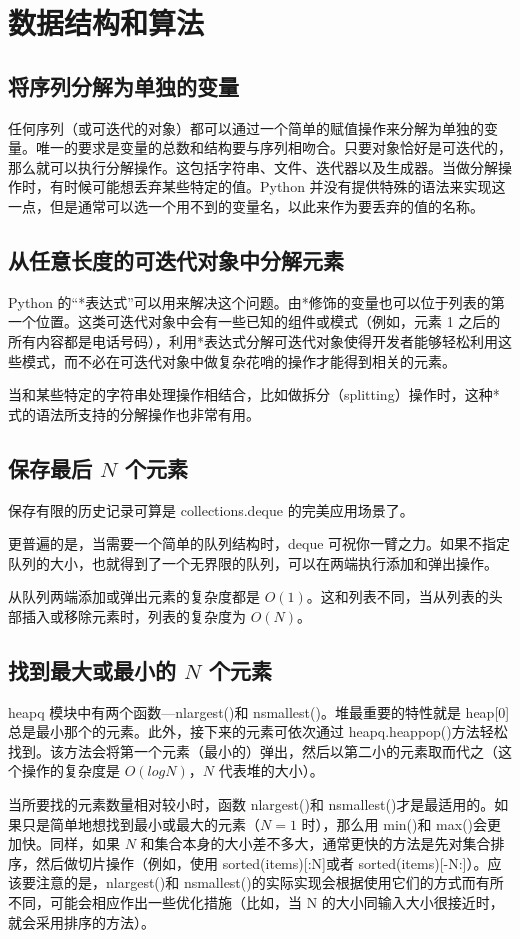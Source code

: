 \chapter{数据结构和算法\label{ch09}}
\section{将序列分解为单独的变量}
任何序列（或可迭代的对象）都可以通过一个简单的赋值操作来分解为单独的变量。唯一的要求是变量的总数和结构要与序列相吻合。只要对象恰好是可迭代的，那么就可以执行分解操作。这包括字符串、文件、迭代器以及生成器。当做分解操作时，有时候可能想丢弃某些特定的值。Python 并没有提供特殊的语法来实现这一点，但是通常可以选一个用不到的变量名，以此来作为要丢弃的值的名称。
\section{从任意长度的可迭代对象中分解元素}
Python 的“*表达式”可以用来解决这个问题。由*修饰的变量也可以位于列表的第一个位置。这类可迭代对象中会有一些已知的组件或模式（例如，元素 1 之后的所有内容都是电话号码），利用*表达式分解可迭代对象使得开发者能够轻松利用这些模式，而不必在可迭代对象中做复杂花哨的操作才能得到相关的元素。

当和某些特定的字符串处理操作相结合，比如做拆分（splitting）操作时，这种*式的语法所支持的分解操作也非常有用。
\section{保存最后 $N$ 个元素}
保存有限的历史记录可算是 collections.deque 的完美应用场景了。

更普遍的是，当需要一个简单的队列结构时，deque 可祝你一臂之力。如果不指定队列的大小，也就得到了一个无界限的队列，可以在两端执行添加和弹出操作。

从队列两端添加或弹出元素的复杂度都是 $O(1)$。这和列表不同，当从列表的头部插入或移除元素时，列表的复杂度为 $O(N)$。
\section{找到最大或最小的 $N$ 个元素}
heapq 模块中有两个函数—nlargest()和 nsmallest()。堆最重要的特性就是 heap[0]总是最小那个的元素。此外，接下来的元素可依次通过 heapq.heappop()方法轻松找到。该方法会将第一个元素（最小的）弹出，然后以第二小的元素取而代之（这个操作的复杂度是 $O(logN)$，$N$ 代表堆的大小）。

当所要找的元素数量相对较小时，函数 nlargest()和 nsmallest()才是最适用的。如果只是简单地想找到最小或最大的元素（$N=1$ 时），那么用 min()和 max()会更加快。同样，如果 $N$ 和集合本身的大小差不多大，通常更快的方法是先对集合排序，然后做切片操作（例如，使用 sorted(items)[:N]或者 sorted(items)[-N:]）。应该要注意的是，nlargest()和 nsmallest()的实际实现会根据使用它们的方式而有所不同，可能会相应作出一些优化措施（比如，当 N 的大小同输入大小很接近时，就会采用排序的方法）。
